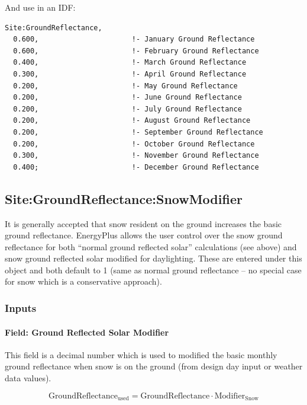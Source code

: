 And use in an IDF:

\begin{lstlisting}
Site:GroundReflectance,
  0.600,                      !- January Ground Reflectance
  0.600,                      !- February Ground Reflectance
  0.400,                      !- March Ground Reflectance
  0.300,                      !- April Ground Reflectance
  0.200,                      !- May Ground Reflectance
  0.200,                      !- June Ground Reflectance
  0.200,                      !- July Ground Reflectance
  0.200,                      !- August Ground Reflectance
  0.200,                      !- September Ground Reflectance
  0.200,                      !- October Ground Reflectance
  0.300,                      !- November Ground Reflectance
  0.400;                      !- December Ground Reflectance
\end{lstlisting}

\subsection{Site:GroundReflectance:SnowModifier}\label{sitegroundreflectancesnowmodifier}

It is generally accepted that snow resident on the ground increases the basic ground reflectance. EnergyPlus allows the user control over the snow ground reflectance for both ``normal ground reflected solar'' calculations (see above) and snow ground reflected solar modified for daylighting. These are entered under this object and both default to 1 (same as normal ground reflectance -- no special case for snow which is a conservative approach).

\subsubsection{Inputs}\label{inputs-20-003}

\paragraph{Field: Ground Reflected Solar Modifier}\label{field-ground-reflected-solar-modifier}

This field is a decimal number which is used to modified the basic monthly ground reflectance when snow is on the ground (from design day input or weather data values).

\begin{equation}
\mathrm{GroundReflectance}_{\mathrm{used}} = \mathrm{GroundReflectance} \cdot \mathrm{Modifier}_{\mathrm{Snow}}
\end{equation}

